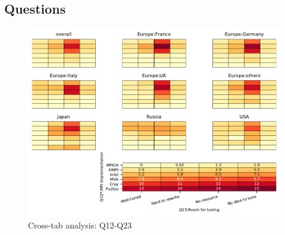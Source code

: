 
\subsection{Questions}


\begin{figure}
\begin{center}
\includegraphics[width=12cm]{../pdfs/Q12-Q23.pdf}
\caption{Cross-tab analysis: Q12-Q23}
\label{fig:Q12-Q23}
\end{center}
\end{figure}
